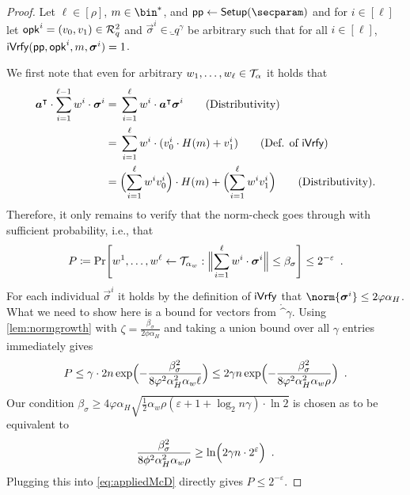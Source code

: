 \begin{proof}
  Let $\ell\in[\rho]$, $m\in\bin^*$, and $\params\gets\setup(\secparam)$ and for $i\in[\ell]$ let $\mathsf{opk}^i=(v_0,v_1) \in \mathcal{R}_q^2$ and $\vec{\sigma}^i \in \ring_q^\gamma$ be arbitrary such that for all $i\in[\ell]$, $\mathsf{iVrfy}(\mathsf{pp},\mathsf{opk}^i,m,\boldsymbol{\sigma}^i)=1$.
  
  We first note that even for arbitrary $w_1,\dots,w_\ell \in \mathcal{T}_\alpha$ it holds that
  \begin{align*}
    \vec{a}^\intercal\cdot \sum_{i=1}^{\ell-1}w^i\cdot\vec{\sigma}^i
    ={}&\sum_{i=1}^{\ell}w^i\cdot\vec{a}^\intercal\vec{\sigma}^i \tag{Distributivity}\\
    ={}&\sum_{i=1}^{\ell}w^i\cdot(v^i_0\cdot H(m)+v^i_1) \tag{Def. of $\iverify$}\\
    ={}&\Bigl(\sum_{i=1}^{\ell}w^iv^i_0\Bigr)\cdot H(m)+ \Bigl(\sum_{i=1}^{\ell}w^iv^i_1\Bigr) \tag{Distributivity}.
  \end{align*}
  Therefore, it only remains to verify that the norm-check goes through with sufficient probability,
  i.e., that
  \[
    P\coloneqq \Pr\mleft[
      w^1,\dots,w^\ell\gets \tern_{\alpha_w}
      :
      \Bigl\Vert\sum_{i=1}^{\ell} w^i\cdot\vec{\sigma}^i\Bigr\Vert \leq \beta_\sigma\mright] \leq 2^{-\varepsilon}\enspace.
  \]
  For each individual $\vec{\sigma}^i$ it holds by the definition of $\mathsf{iVrfy}$ that $\norm{\vec{\sigma}^i} \leq 2\varphi\alpha_H$.
  What we need to show here is a bound for vectors from $\ring^\gamma$.
  Using \autoref{lem:normgrowth} with $\zeta = \tfrac{\beta_\sigma}{2\phi\alpha_H}$ and taking a union bound over all $\gamma$ entries immediately gives
  \begin{align}\label{eq:appliedMcD}
   P \leq \gamma\cdot 2n\exp\Bigl(-\frac{\beta_\sigma^2}{8\varphi^2\alpha_H^2\alpha_w\ell}\Bigr) \leq 2\gamma n\exp\Bigl(-\frac{\beta_\sigma^2}{8\varphi^2\alpha_H^2\alpha_w\rho}\Bigr)\enspace.
  \end{align}
Our condition $\beta_\sigma \geq 4\varphi\alpha_H\sqrt{\tfrac{1}{2}\alpha_w\rho(\varepsilon+1+\log_2n\gamma)\cdot\ln2}$ is chosen as to be equivalent to
\[
 \frac{\beta_\sigma^2}{8\phi^2\alpha^2_H\alpha_w\rho} \geq \ln\Bigl( 2\gamma n \cdot 2^\varepsilon \Bigr)\enspace.
\]
Plugging this into \autoref{eq:appliedMcD} directly gives $P \leq 2^{-\varepsilon}$.

\end{proof}

